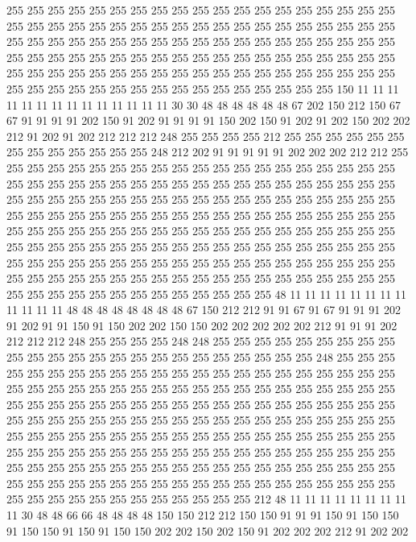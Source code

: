 255 255 255 255 255 255 255 255 255 255 255 255 255 255 255 255 255 255 255 255
255 255 255 255 255 255 255 255 255 255 255 255 255 255 255 255 255 255 255 255
255 255 255 255 255 255 255 255 255 255 255 255 255 255 255 255 255 255 255 255
255 255 255 255 255 255 255 255 255 255 255 255 255 255 255 255 255 255 255 255
255 255 255 255 255 255 255 255 255 255 255 255 255 255 255 255 255 255 255 255
255 255 255 255 255 255 255 255 255 255 255 150 11 11 11 11 11 11 11 11
11 11 11 11 11 11 30 30 48 48 48 48 48 48 67 202 150 212 150 67
67 91 91 91 91 202 150 91 202 91 91 91 91 150 202 150 91 202 91 202
150 202 202 212 91 202 91 202 212 212 212 248 255 255 255 255 212 255 255 255
255 255 255 255 255 255 255 255 255 255 248 212 202 91 91 91 91 91 202 202
202 212 212 255 255 255 255 255 255 255 255 255 255 255 255 255 255 255 255 255
255 255 255 255 255 255 255 255 255 255 255 255 255 255 255 255 255 255 255 255
255 255 255 255 255 255 255 255 255 255 255 255 255 255 255 255 255 255 255 255
255 255 255 255 255 255 255 255 255 255 255 255 255 255 255 255 255 255 255 255
255 255 255 255 255 255 255 255 255 255 255 255 255 255 255 255 255 255 255 255
255 255 255 255 255 255 255 255 255 255 255 255 255 255 255 255 255 255 255 255
255 255 255 255 255 255 255 255 255 255 255 255 255 255 255 255 255 255 255 255
255 255 255 255 255 255 255 255 255 255 255 255 255 255 255 255 255 255 255 255
255 255 255 255 255 255 255 255 255 48 11 11 11 11 11 11 11 11 11 11
11 11 48 48 48 48 48 48 48 48 67 150 212 212 91 91 67 91 67 91
91 91 202 91 202 91 91 150 91 150 202 202 150 150 202 202 202 202 202 212
91 91 91 202 212 212 212 248 255 255 255 255 248 248 255 255 255 255 255 255
255 255 255 255 255 255 255 255 255 255 255 255 255 255 255 255 255 255 248 255
255 255 255 255 255 255 255 255 255 255 255 255 255 255 255 255 255 255 255 255
255 255 255 255 255 255 255 255 255 255 255 255 255 255 255 255 255 255 255 255
255 255 255 255 255 255 255 255 255 255 255 255 255 255 255 255 255 255 255 255
255 255 255 255 255 255 255 255 255 255 255 255 255 255 255 255 255 255 255 255
255 255 255 255 255 255 255 255 255 255 255 255 255 255 255 255 255 255 255 255
255 255 255 255 255 255 255 255 255 255 255 255 255 255 255 255 255 255 255 255
255 255 255 255 255 255 255 255 255 255 255 255 255 255 255 255 255 255 255 255
255 255 255 255 255 255 255 255 255 255 255 255 255 255 255 255 255 255 255 255
255 255 255 255 255 255 212 48 11 11 11 11 11 11 11 11 11 30 48 48
66 66 48 48 48 48 150 150 212 212 150 150 91 91 91 150 91 150 150 91
150 150 91 150 91 150 150 202 202 150 202 150 91 202 202 202 212 91 202 202
